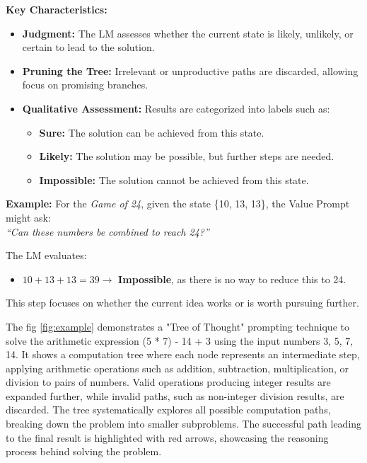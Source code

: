 \documentclass[12pt, a4paper]{article}
\begin{document}
\begin{enumerate}
    \textbf{Key Characteristics:}
    \begin{itemize}
        \item \textbf{Judgment:} The LM assesses whether the current state is likely, unlikely, or certain to lead to the solution.
        \item \textbf{Pruning the Tree:} Irrelevant or unproductive paths are discarded, allowing focus on promising branches.
        \item \textbf{Qualitative Assessment:} Results are categorized into labels such as:
        \begin{itemize}
            \item \textbf{Sure:} The solution can be achieved from this state.
            \item \textbf{Likely:} The solution may be possible, but further steps are needed.
            \item \textbf{Impossible:} The solution cannot be achieved from this state.
        \end{itemize}
    \end{itemize}
    
    \textbf{Example:}
    For the \textit{Game of 24}, given the state \{10, 13, 13\}, the Value Prompt might ask: \\
    \textit{``Can these numbers be combined to reach 24?''}
    
    The LM evaluates:
    \begin{itemize}
        \item $10 + 13 + 13 = 39 \rightarrow$ \textbf{Impossible}, as there is no way to reduce this to 24.
    \end{itemize}
    
    This step focuses on whether the current idea works or is worth pursuing further.

\end{enumerate}
\bigskip
The fig \ref{fig:example} demonstrates a "Tree of Thought" prompting technique to solve the arithmetic expression (5 * 7) - 14 + 3 using the input numbers 3, 5, 7, 14. It shows a computation tree where each node represents an intermediate step, applying arithmetic operations such as addition, subtraction, multiplication, or division to pairs of numbers. Valid operations producing integer results are expanded further, while invalid paths, such as non-integer division results, are discarded. The tree systematically explores all possible computation paths, breaking down the problem into smaller subproblems. The successful path leading to the final result is highlighted with red arrows, showcasing the reasoning process behind solving the problem.
\end{document}

